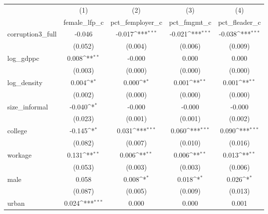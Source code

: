 {
\def\sym#1{\ifmmode^{#1}\else\(^{#1}\)\fi}
\begin{tabular}{l*{4}{c}}
\hline\hline
            &\multicolumn{1}{c}{(1)}&\multicolumn{1}{c}{(2)}&\multicolumn{1}{c}{(3)}&\multicolumn{1}{c}{(4)}\\
            &\multicolumn{1}{c}{female\_lfp\_c}&\multicolumn{1}{c}{pct\_femployer\_c}&\multicolumn{1}{c}{pct\_fmgmt\_c}&\multicolumn{1}{c}{pct\_fleader\_c}\\
\hline
corruption3\_full&      -0.046         &      -0.017\sym{***}&      -0.021\sym{***}&      -0.038\sym{***}\\
            &     (0.052)         &     (0.004)         &     (0.006)         &     (0.009)         \\
[1em]
log\_gdppc   &       0.008\sym{**} &      -0.000         &       0.000         &       0.000         \\
            &     (0.003)         &     (0.000)         &     (0.000)         &     (0.000)         \\
[1em]
log\_density &       0.004\sym{*}  &       0.000\sym{*}  &       0.001\sym{**} &       0.001\sym{**} \\
            &     (0.002)         &     (0.000)         &     (0.000)         &     (0.000)         \\
[1em]
size\_informal&      -0.040\sym{*}  &      -0.000         &      -0.000         &      -0.000         \\
            &     (0.023)         &     (0.001)         &     (0.001)         &     (0.002)         \\
[1em]
college     &      -0.145\sym{*}  &       0.031\sym{***}&       0.060\sym{***}&       0.090\sym{***}\\
            &     (0.082)         &     (0.007)         &     (0.010)         &     (0.016)         \\
[1em]
workage     &       0.131\sym{**} &       0.006\sym{**} &       0.006\sym{**} &       0.013\sym{**} \\
            &     (0.053)         &     (0.003)         &     (0.003)         &     (0.006)         \\
[1em]
male        &       0.058         &       0.008\sym{*}  &       0.018\sym{*}  &       0.026\sym{*}  \\
            &     (0.087)         &     (0.005)         &     (0.009)         &     (0.013)         \\
[1em]
urban       &       0.024\sym{***}&       0.000         &       0.000         &       0.001         \\

\end{tabular}}

